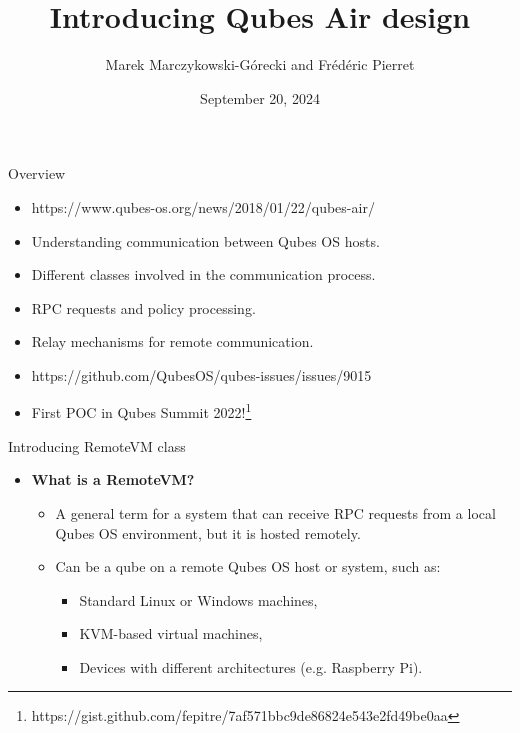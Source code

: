 \documentclass{beamer}
\title{Introducing Qubes Air design}
\author{Marek Marczykowski-Górecki and Frédéric Pierret}
\date{September 20, 2024}
\begin{document}
\frame{\titlepage}


\begin{frame}{Overview}
    \begin{itemize}
		\item https://www.qubes-os.org/news/2018/01/22/qubes-air/
        \item Understanding communication between Qubes OS hosts.
        \item Different classes involved in the communication process.
        \item RPC requests and policy processing.
        \item Relay mechanisms for remote communication.
		\item https://github.com/QubesOS/qubes-issues/issues/9015
		\item First POC in Qubes Summit 2022!\footnote{https://gist.github.com/fepitre/7af571bbc9de86824e543e2fd49be0aa}
    \end{itemize}
\end{frame}

\begin{frame}{Introducing RemoteVM class}
    \begin{itemize}
        \item \textbf{What is a RemoteVM?}
        \begin{itemize}
            \item A general term for a system that can receive RPC requests from a local Qubes OS environment, but it is hosted remotely.
            \item Can be a qube on a remote Qubes OS host or system, such as:
            \begin{itemize}
                \item Standard Linux or Windows machines,
                \item KVM-based virtual machines,
                \item Devices with different architectures (e.g. Raspberry Pi).
            \end{itemize}
        \end{itemize}
    \end{itemize}
\end{frame}
\end{document}
